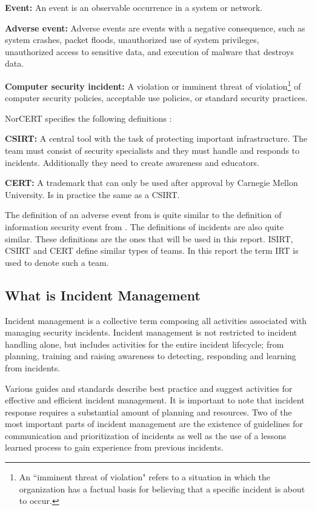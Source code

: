 \textbf{Event:} An event is an observable occurrence in a system or network.

\textbf{Adverse event:} Adverse events are events with a negative consequence, such as system crashes, packet floods, unauthorized use of system privileges, unauthorized access to sensitive data, and execution of malware that destroys data.

\textbf{Computer security incident:} A violation or imminent threat of violation\footnote{An ``imminent threat of violation" refers to a situation in which the organization has a factual basis for believing that a specific incident is about to occur.} of computer security policies, acceptable use policies, or standard security practices.

\acs{NorCERT} specifies the following definitions \cite{NorCERT3Kvartal2012}:

\textbf{\ac{CSIRT}:} A central tool with the task of protecting important infrastructure. The team must consist of security specialists and they must handle and responds to incidents. Additionally they need to create awareness and educators.

\textbf{\ac{CERT}:} A trademark that can only be used after approval by Carnegie Mellon University. Is in practice the same as a \acs{CSIRT}.

The definition of an adverse event from \cite{nist800-61} is quite similar to the definition of information security event from \cite{ISO/IEC27000}. The definitions of incidents are also quite similar. These definitions are the ones that will be used in this report. \ac{ISIRT}, \ac{CSIRT} and \ac{CERT} define similar types of teams. In this report the term \acs{IRT} is used to denote such a team. 

\subsection{What is Incident Management}
Incident management is a collective term composing all activities associated with managing security incidents. Incident management is not restricted to incident handling alone, but includes activities for the entire incident lifecycle; from planning, training and raising awareness to detecting, responding and learning from incidents. 

Various guides and standards describe best practice and suggest activities for effective and efficient incident management. It is important to note that incident response requires a substantial amount of planning and resources. Two of the most important parts of incident management are the existence of guidelines for communication and prioritization of incidents as well as the use of a lessons learned process to gain experience from previous incidents. \cite{nist800-61}

